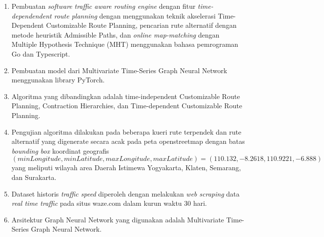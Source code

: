 \begin{enumerate}
    \item Pembuatan \textit{software} \textit{traffic aware routing engine} dengan fitur \textit{time-dependendent route planning} dengan menggunakan teknik akselerasi Time-Dependent Customizable Route Planning, pencarian rute alternatif dengan metode heuristik Admissible Paths, dan \textit{online map-matching } dengan Multiple Hypothesis Technique (MHT) menggunakan bahasa pemrograman Go dan Typescript.
    \item Pembuatan model dari Multivariate Time-Series Graph Neural Network menggunakan library PyTorch.
    \item Algoritma yang dibandingkan adalah time-independent Customizable Route Planning, Contraction Hierarchies, dan Time-dependent Customizable Route Planning.
    \item Pengujian algoritma dilakukan pada beberapa kueri rute terpendek dan rute alternatif yang digenerate secara acak pada peta openstreetmap dengan batas \textit{bounding box} koordinat geografis $(minLongitude,minLatitude,maxLongitude,maxLatitude)=(110.132,-8.2618,110.9221,-6.888)$ yang meliputi wilayah area Daerah Istimewa Yogyakarta, Klaten, Semarang, dan Surakarta. 
    \item Dataset historis \textit{traffic speed} diperoleh dengan melakukan \textit{web scraping} data \textit{real time traffic} pada situs waze.com dalam kurun waktu 30 hari.
    \item Arsitektur Graph Neural Network yang digunakan adalah Multivariate Time-Series Graph Neural Network.
\end{enumerate}